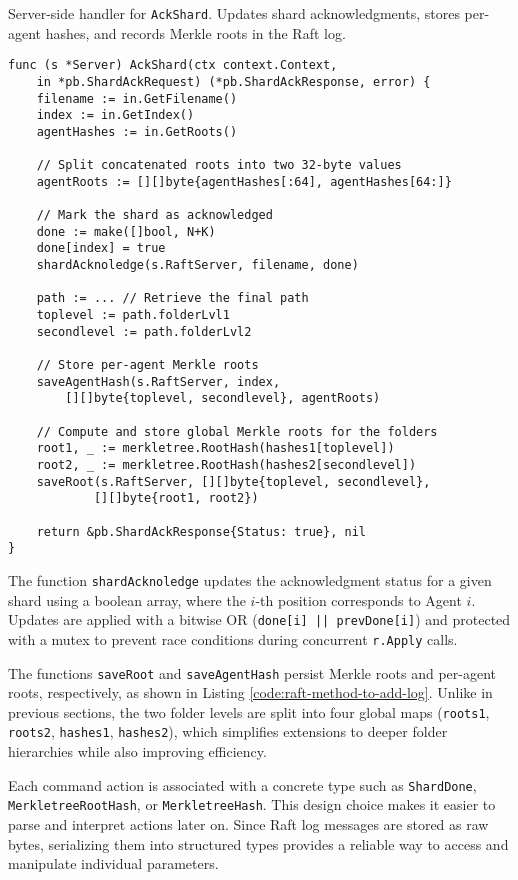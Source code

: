 \begin{listing}
\caption{Server-side handler for \texttt{AckShard}. Updates shard acknowledgments, stores per-agent hashes, and records Merkle roots in the Raft log.}
\label{code:ack-shard}
\begin{verbatim}
func (s *Server) AckShard(ctx context.Context,
    in *pb.ShardAckRequest) (*pb.ShardAckResponse, error) {
    filename := in.GetFilename()
    index := in.GetIndex()
    agentHashes := in.GetRoots()

    // Split concatenated roots into two 32-byte values
    agentRoots := [][]byte{agentHashes[:64], agentHashes[64:]}

    // Mark the shard as acknowledged
    done := make([]bool, N+K)
    done[index] = true
    shardAcknoledge(s.RaftServer, filename, done)

    path := ... // Retrieve the final path
    toplevel := path.folderLvl1
    secondlevel := path.folderLvl2

    // Store per-agent Merkle roots
    saveAgentHash(s.RaftServer, index,
        [][]byte{toplevel, secondlevel}, agentRoots)

    // Compute and store global Merkle roots for the folders
    root1, _ := merkletree.RootHash(hashes1[toplevel])
    root2, _ := merkletree.RootHash(hashes2[secondlevel])
    saveRoot(s.RaftServer, [][]byte{toplevel, secondlevel},
            [][]byte{root1, root2})

    return &pb.ShardAckResponse{Status: true}, nil
}
\end{verbatim}
\end{listing}

The function \texttt{shardAcknoledge} updates the acknowledgment status for a given shard using a boolean array, where the $i$-th position corresponds to Agent $i$. Updates are applied with a bitwise OR (\texttt{done[i] || prevDone[i]}) and protected with a mutex to prevent race conditions during concurrent \texttt{r.Apply} calls.

The functions \texttt{saveRoot} and \texttt{saveAgentHash} persist Merkle roots and per-agent roots, respectively, as shown in Listing \ref{code:raft-method-to-add-log}. Unlike in previous sections, the two folder levels are split into four global maps (\texttt{roots1}, \texttt{roots2}, \texttt{hashes1}, \texttt{hashes2}), which simplifies extensions to deeper folder hierarchies while also improving efficiency.

Each command action is associated with a concrete type such as \texttt{ShardDone}, \texttt{MerkletreeRootHash}, or \texttt{MerkletreeHash}. This design choice makes it easier to parse and interpret actions later on. Since Raft log messages are stored as raw bytes, serializing them into structured types provides a reliable way to access and manipulate individual parameters.

